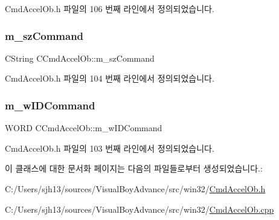Cmd\+Accel\+Ob.\+h 파일의 106 번째 라인에서 정의되었습니다.

\mbox{\label{class_c_cmd_accel_ob_acbd02cc68d3909b1e39b687e76f45d91}} 
\subsubsection{\texorpdfstring{m\+\_\+sz\+Command}{m\_szCommand}}
{\footnotesize\ttfamily C\+String C\+Cmd\+Accel\+Ob\+::m\+\_\+sz\+Command}



Cmd\+Accel\+Ob.\+h 파일의 104 번째 라인에서 정의되었습니다.

\mbox{\label{class_c_cmd_accel_ob_aa3eb02dcd39ff14763fdefd8fabd7591}} 
\subsubsection{\texorpdfstring{m\+\_\+w\+I\+D\+Command}{m\_wIDCommand}}
{\footnotesize\ttfamily W\+O\+RD C\+Cmd\+Accel\+Ob\+::m\+\_\+w\+I\+D\+Command}



Cmd\+Accel\+Ob.\+h 파일의 103 번째 라인에서 정의되었습니다.



이 클래스에 대한 문서화 페이지는 다음의 파일들로부터 생성되었습니다.\+:\begin{DoxyCompactItemize}
\item 
C\+:/\+Users/sjh13/sources/\+Visual\+Boy\+Advance/src/win32/\mbox{\hyperlink{_cmd_accel_ob_8h}{Cmd\+Accel\+Ob.\+h}}\item 
C\+:/\+Users/sjh13/sources/\+Visual\+Boy\+Advance/src/win32/\mbox{\hyperlink{_cmd_accel_ob_8cpp}{Cmd\+Accel\+Ob.\+cpp}}\end{DoxyCompactItemize}
